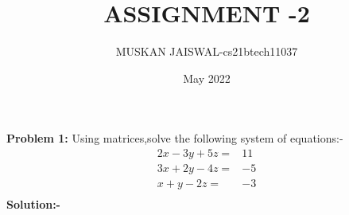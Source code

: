 \documentclass[two column]{article}
\title{ASSIGNMENT -2}
\author{MUSKAN JAISWAL-cs21btech11037}
\date{May 2022}
\begin{document}
\newcommand{\solution}{\noindent \textbf{solution}}
\newcommand{\myvec}[1]{\ensuremath{\begin{pmatrix}#1\end{pmatrix}}}
\newcommand{\mydet}[1]{\ensuremath{\begin{vmatrix}#1\end{vmatrix}}}
\let\vec\mathbf
\maketitle

\textbf{Problem 1: } Using matrices,solve the following system of equations:-
\begin{align*}
2x-3y+5z=&11\\
3x+2y-4z=&-5\\
x+y-2z=&-3\\
\end{align*}
\textbf{Solution:-}  
\end{document}
